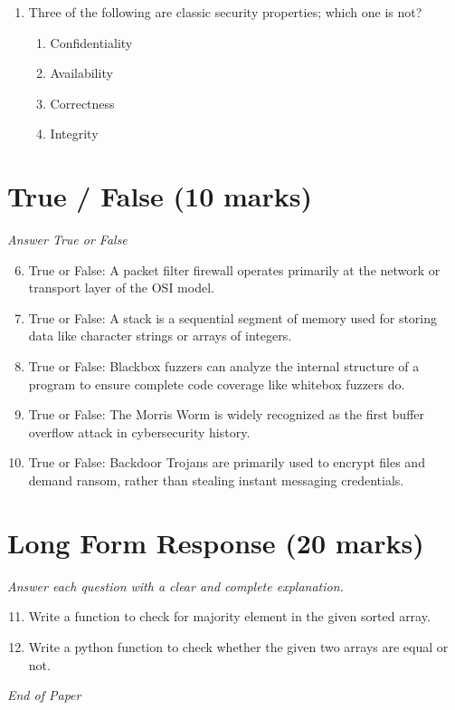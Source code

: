 \documentclass[12pt]{article}
\begin{document}
\begin{enumerate}[label=\arabic*.]
\begin{enumerate}[label=(\alph*)]
    \item Each input is mutation that follows a given grammar
    \item It only makes sense for file-based fuzzing, not network-based fuzzing
\end{enumerate}
\item Three of the following are classic security properties; which one is not?
\begin{enumerate}[label=(\alph*)]
    \item Confidentiality
    \item Availability
    \item Correctness
    \item Integrity
\end{enumerate}
\end{enumerate}

\section*{True / False (10 marks)}
\textit{Answer True or False}
\begin{enumerate}[label=\arabic*.]
\setcounter{enumi}{5}
\item True or False: A packet filter firewall operates primarily at the network or transport layer of the OSI model.
\item True or False: A stack is a sequential segment of memory used for storing data like character strings or arrays of integers.
\item True or False: Blackbox fuzzers can analyze the internal structure of a program to ensure complete code coverage like whitebox fuzzers do.
\item True or False: The Morris Worm is widely recognized as the first buffer overflow attack in cybersecurity history.
\item True or False: Backdoor Trojans are primarily used to encrypt files and demand ransom, rather than stealing instant messaging credentials.
\end{enumerate}

\section*{Long Form Response (20 marks)}
\textit{Answer each question with a clear and complete explanation.}
\begin{enumerate}[label=\arabic*.]
\setcounter{enumi}{10}
\item Write a function to check for majority element in the given sorted array.
\item Write a python function to check whether the given two arrays are equal or not.
\end{enumerate}

\vfill
\noindent\textit{End of Paper}
\end{document}
